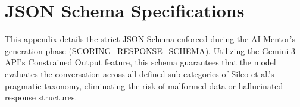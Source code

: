 
\chapter{JSON Schema Specifications}
\label{sec:appendixg}

This appendix details the strict JSON Schema enforced during the AI Mentor's generation phase (SCORING\_RESPONSE\_SCHEMA). Utilizing the Gemini 3 API's Constrained Output feature, this schema guarantees that the model evaluates the conversation across all defined sub-categories of Sileo et al.'s pragmatic taxonomy, eliminating the risk of malformed data or hallucinated response structures.

